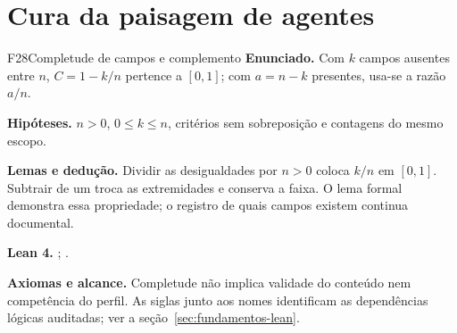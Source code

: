 \section{Cura da paisagem de agentes}
\begin{formalizacao}{F28}{Completude de campos e complemento}
\textbf{Enunciado.} Com $k$ campos ausentes entre $n$, $C=1-k/n$ pertence a $[0,1]$; com $a=n-k$ presentes, usa-se a razão $a/n$.

\textbf{Hipóteses.} $n>0$, $0\leq k\leq n$, critérios sem sobreposição e contagens do mesmo escopo.

\textbf{Lemas e dedução.} Dividir as desigualdades por $n>0$ coloca $k/n$ em $[0,1]$. Subtrair de um troca as extremidades e conserva a faixa. O lema formal demonstra essa propriedade; o registro de quais campos existem continua documental.

\textbf{Lean 4.} ; .

\textbf{Axiomas e alcance.} Completude não implica validade do conteúdo nem competência do perfil. As siglas junto aos nomes identificam as dependências lógicas auditadas; ver a seção~\ref{sec:fundamentos-lean}.
\end{formalizacao}

